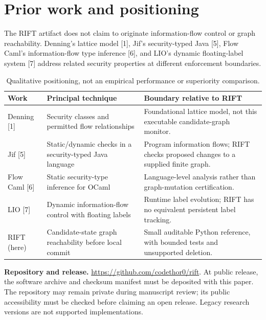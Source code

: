 \documentclass[11pt,letterpaper]{article}
\begin{document}
\section{Prior work and positioning}
The RIFT artifact does not claim to originate information-flow control or graph reachability. Denning's lattice model [1], Jif's security-typed Java [5], Flow Caml's information-flow type inference [6], and LIO's dynamic floating-label system [7] address related security properties at different enforcement boundaries.
\begin{table}[H]
\centering\footnotesize
\begin{tabularx}{\linewidth}{@{}p{.18\linewidth}p{.31\linewidth}X@{}}\toprule
Work & Principal technique & Boundary relative to RIFT\\\midrule
Denning [1] & Security classes and permitted flow relationships & Foundational lattice model, not this executable candidate-graph monitor.\\
Jif [5] & Static/dynamic checks in a security-typed Java language & Program information flows; RIFT checks proposed changes to a supplied finite graph.\\
Flow Caml [6] & Static security-type inference for OCaml & Language-level analysis rather than graph-mutation certification.\\
LIO [7] & Dynamic information-flow control with floating labels & Runtime label evolution; RIFT has no equivalent persistent label tracking.\\
RIFT (here) & Candidate-state graph reachability before local commit & Small auditable Python reference, with bounded tests and unsupported deletion.\\\bottomrule
\end{tabularx}
\caption{Qualitative positioning, not an empirical performance or superiority comparison.}
\end{table}
\noindent\textbf{Repository and release.} \url{https://github.com/codethor0/rift}. At public release, the software archive and checksum manifest must be deposited with this paper. The repository may remain private during manuscript review; its public accessibility must be checked before claiming an open release. Legacy research versions are not supported implementations.
\end{document}
